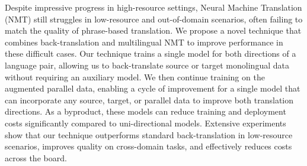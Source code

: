 Despite impressive progress in high-resource settings, Neural Machine Translation (NMT) still struggles in low-resource and out-of-domain scenarios, often failing to match the quality of phrase-based translation. We propose a novel technique that combines back-translation and multilingual NMT to improve performance in these difficult cases. Our technique trains a single model for both directions of a language pair, allowing us to back-translate source or target monolingual data without requiring an auxiliary model. We then continue training on the augmented parallel data, enabling a cycle of improvement for a single model that can incorporate any source, target, or parallel data to improve both translation directions. As a byproduct, these models can reduce training and deployment costs significantly compared to uni-directional models. Extensive experiments show that our technique outperforms standard back-translation in low-resource scenarios, improves quality on cross-domain tasks, and effectively reduces costs across the board.
